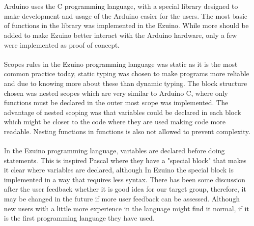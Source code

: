 \\\\
Arduino uses the C programming language, with a special library designed to make development and usage of the Arduino easier for the users. 
The most basic of functions in the library was implemented in the Ezuino. While more should be added to make Ezuino better interact with the Arduino hardware, only a few were implemented as proof of concept.
\\\\
Scopes rules in the Ezuino programming language was static as it is the most common practice today, static typing was chosen to make programs more reliable and due to knowing more about these than dynamic typing. The block structure chosen was nested scopes which are very similar to Arduino C, where only functions must be declared in the outer most scope was implemented. The advantage of nested scoping was that variables could be declared in each block which might be closer to the code where they are used making code more readable. Nesting functions in functions is also not allowed to prevent complexity.
\\\\
In the Ezuino programming language, variables are declared before doing statements. This is inspired Pascal where they have a "special block" that makes it clear where variables are declared, although In Ezuino the special block is implemented in a way that requires less syntax. There has been some discussion after the user feedback whether it is good idea for our target group, therefore, it may be changed in the future if more user feedback can be assessed. Although new users with a little more experience in the language might find it normal, if it is the first programming language they have used.
 



